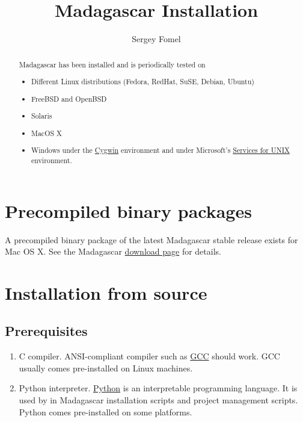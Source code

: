 \title{Madagascar Installation}
\author{Sergey Fomel}

%

\maketitle

\begin{abstract}
Madagascar has been installed and is periodically tested on
\begin{itemize}
\item Different Linux distributions (Fedora, RedHat, SuSE, Debian, Ubuntu)
\item FreeBSD and OpenBSD
\item Solaris
\item MacOS X
\item Windows under the \href{http://www.cygwin.com/}{Cygwin} environment and 
under Microsoft's \href{http://www.microsoft.com/technet/interopmigration/unix/sfu/default.mspx}{Services for UNIX} environment.
\end{itemize}
\end{abstract}

\section{Precompiled binary packages}

A precompiled binary package of the latest Madagascar stable release
exists for Mac OS X. See the Madagascar
\href{http://rsf.sourceforge.net/Download}{download page} for details.

\section{Installation from source}

\subsection{Prerequisites}

\begin{enumerate}
\item C compiler. ANSI-compliant compiler such as
  \href{http://gcc.gnu.org/}{GCC} should work. GCC usually comes pre-installed
  on Linux machines.
\item Python interpreter. \href{http://www.python.org/}{Python} is an
  interpretable programming language. It is used by in Madagascar
  installation scripts and project management scripts.  Python comes
  pre-installed on some platforms.
\end{enumerate}

